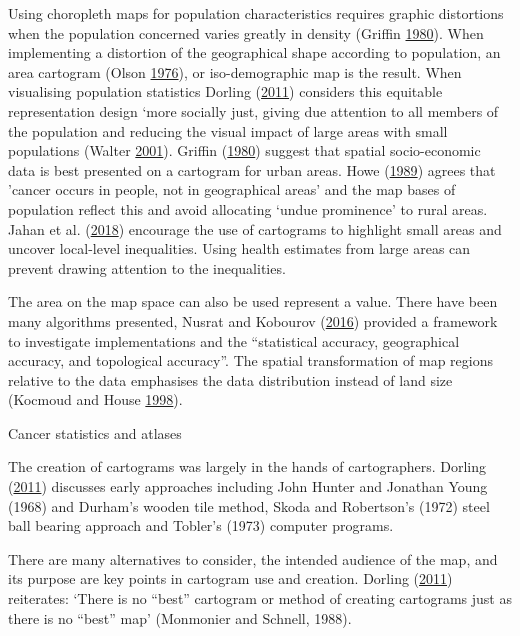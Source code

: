 \documentclass[11pt,]{article}
\begin{document}
Using choropleth maps for population characteristics requires graphic
distortions when the population concerned varies greatly in density
(Griffin \protect\hyperlink{ref-CTTMB}{1980}). When implementing a
distortion of the geographical shape according to population, an area
cartogram (Olson \protect\hyperlink{ref-NAC}{1976}), or iso-demographic
map is the result. When visualising population statistics Dorling
(\protect\hyperlink{ref-ACTUC}{2011}) considers this equitable
representation design `more socially just, giving due attention to all
members of the population and reducing the visual impact of large areas
with small populations (Walter \protect\hyperlink{ref-DMAHP}{2001}).
Griffin (\protect\hyperlink{ref-CTTMB}{1980}) suggest that spatial
socio-economic data is best presented on a cartogram for urban areas.
Howe (\protect\hyperlink{ref-HEDP}{1989}) agrees that 'cancer occurs in
people, not in geographical areas' and the map bases of population
reflect this and avoid allocating `undue prominence' to rural areas.
Jahan et al. (\protect\hyperlink{ref-MTMSIH}{2018}) encourage the use of
cartograms to highlight small areas and uncover local-level
inequalities. Using health estimates from large areas can prevent
drawing attention to the inequalities.

The area on the map space can also be used represent a value. There have
been many algorithms presented, Nusrat and Kobourov
(\protect\hyperlink{ref-SAIC}{2016}) provided a framework to investigate
implementations and the ``statistical accuracy, geographical accuracy,
and topological accuracy''. The spatial transformation of map regions
relative to the data emphasises the data distribution instead of land
size (Kocmoud and House \protect\hyperlink{ref-CBATCC}{1998}).

Cancer statistics and atlases

The creation of cartograms was largely in the hands of cartographers.
Dorling (\protect\hyperlink{ref-ACTUC}{2011}) discusses early approaches
including John Hunter and Jonathan Young (1968) and Durham's wooden tile
method, Skoda and Robertson's (1972) steel ball bearing approach and
Tobler's (1973) computer programs.

There are many alternatives to consider, the intended audience of the
map, and its purpose are key points in cartogram use and creation.
Dorling (\protect\hyperlink{ref-ACTUC}{2011}) reiterates: `There is no
``best'' cartogram or method of creating cartograms just as there is no
``best'' map' (Monmonier and Schnell, 1988).
\end{document}
